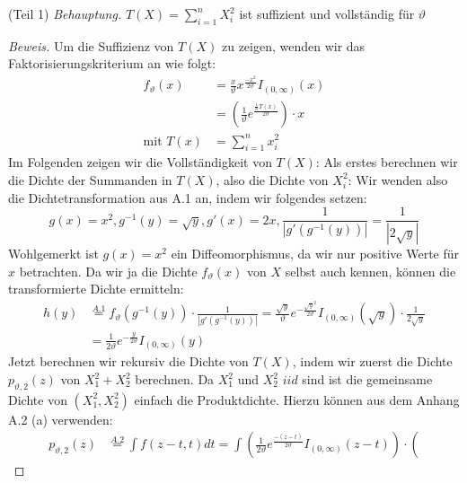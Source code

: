 \documentclass[a4paper]{article}
\newcommand{\beh}{\textit{Behauptung. }}
\newenvironment{Aufgabe}[2][Aufgabe]{\begin{trivlist}
\item[\hskip \labelsep {\bfseries #1}\hskip \labelsep {\bfseries #2.}]}{\end{trivlist}}
\begin{document}
\begin{theorem} %
\begin{Aufgabe}{2} %
\end{Aufgabe}

(Teil 1)
\beh $T(X) = \sum_{i=1}^{n} X_i ^2$ ist suffizient und vollständig für $\vartheta$

\begin{proof}[Beweis]
	Um die Suffizienz von $T(X)$ zu zeigen, wenden wir das Faktorisierungskriterium an wie folgt:
	\begin{align*}
		f_\vartheta (x) &= \frac{ x }{ \vartheta } x ^{ \frac{ - x ^2 }{ 2 \vartheta } }
		I_{ ( 0, \infty ) } (x) \\
			&= \left(
				\frac{ 1 }{ \vartheta } e ^{ \frac{ 
						\frac{ 1 }{ n } T(x)
				}{ 2 \vartheta } }
			\right) \cdot x \\
		\text{mit } T(x) &= \sum_{i=1}^{n} x_i ^2
	\end{align*}
	Im Folgenden zeigen wir die Vollständigkeit von $T(X)$:
	Als erstes berechnen wir die Dichte der Summanden in $T(X)$, also die Dichte von
	$X_i ^2$:
	Wir wenden also die Dichtetransformation aus A.1 an, indem wir folgendes setzen:
	\[
		g(x) = x ^2, g ^{-1} (y) = \sqrt{y} , g' (x) = 2 x,
		\frac{ 1 }{ | g'(g ^{-1} (y)) | } = \frac{ 1 }{ | 2 \sqrt{y} | }
	\] 
	Wohlgemerkt ist $g(x) = x ^2$ ein Diffeomorphismus, da wir nur positive Werte für $x$ betrachten.
	Da wir ja die Dichte $f_\vartheta (x)$ von $X$ selbst auch kennen, können die transformierte Dichte ermitteln:
	\begin{align*}
		h(y) & \overset{A.1} = f_\vartheta (g ^{-1} (y)) \cdot \frac{ 1 }{ | g' (g ^{-1} (y)) | }
		= \frac{ \sqrt{y} }{ \vartheta } e ^{ - \frac{ \sqrt{y} ^2 }{ 2 \vartheta } }
		I_{ ( 0, \infty ) } ( \sqrt{y} ) \cdot
		\frac{ 1 }{ 2 \sqrt{y} } \\
			 &= \frac{ 1 }{ 2 \vartheta } e ^{ - \frac{ y }{ 2 \vartheta } } I_{ ( 0, \infty ) } (y) 
	\end{align*}
	Jetzt berechnen wir rekursiv die Dichte von $T(X)$, indem wir zuerst die Dichte $p_{\vartheta, 2}(z)$
	von $X_1 ^2 + X_2 ^2$ berechnen. Da $X_1 ^2$ und $X_2 ^2$ $iid$ sind ist die gemeinsame
	Dichte von $(X_1 ^2, X_2 ^2)$ einfach die Produktdichte.
	Hierzu können aus dem Anhang A.2 (a) verwenden:
	\begin{align*}
		p_{\vartheta, 2} (z) & \overset{A.2} = \int f(z - t, t) dt
		= \int \left(
			\frac{ 1 }{ 2 \vartheta } e ^{ \frac{ - (z - t) }{ 2 \vartheta } }
			I_{ ( 0, \infty ) } (z - t) 
		\right) \cdot
		\left(

\end{align*}
\end{proof}
\end{theorem}
\end{document}

